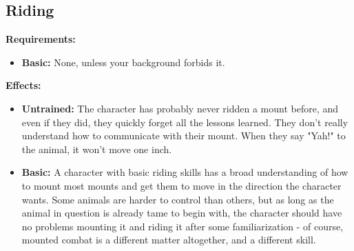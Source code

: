 \subsection{Riding}
\begin{table}[!ht]
\centering
{}
\end{table}
\textbf{Requirements:}
\begin{itemize}
	\item \textbf{Basic:} None, unless your background forbids it.
\end{itemize}
\textbf{Effects:}
\begin{itemize}
	\item \textbf{Untrained:} The character has probably never ridden a mount before, and even if they did, they quickly forget all the lessons learned. They don't really understand how to communicate with their mount. When they say "Yah!" to the animal, it won't move one inch. 
	\item \textbf{Basic:} A character with basic riding skills has a broad understanding of how to mount most mounts and get them to move in the direction the character wants. Some animals are harder to control than others, but as long as the animal in question is already tame to begin with, the character should have no problems mounting it and riding it after some familiarization - of course, mounted combat is a different matter altogether, and a different skill.
\end{itemize}\newpage

